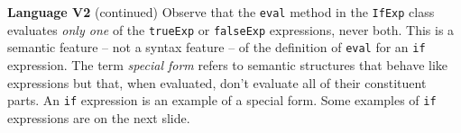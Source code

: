 \begin{minipage}[t]{\sw}
\slidenumber
\LARGE
{\bf Language V2} (continued)\exx
\Large
{}\exx
\LARGE
Observe that the \verb'eval' method in the \verb'IfExp' class
evaluates {\em only one}
of the \verb'trueExp' or \verb'falseExp' expressions, never both.
This is a semantic feature -- not a syntax feature --
of the definition of \verb'eval' for an \verb'if' expression.
The term {\em special form} refers
to semantic structures that behave like expressions
but that, when evaluated, don't evaluate all of their constituent parts.
An \verb'if' expression is an example of a special form.\exx
Some examples of \verb'if' expressions are on the next slide.
\end{minipage}
\clearpage
